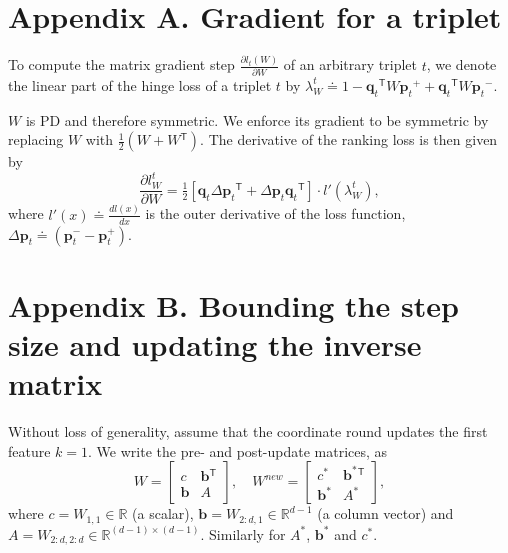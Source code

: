 \documentclass[twoside,11pt]{article}
\newcommand\mat[1]{{#1}}
\renewcommand\vec[1]{\mathbf{#1}}
\newcommand{\T}{{}^\mathsf{T}}
\newcommand{\W}{\mat{W}}
\newcommand{\newW}{{\mat{W^{new}}}}
\newcommand{\eqdef}{\doteq}
\newcommand{\R}{\mathbb{R}}
\newcommand{\q}{{\vec{q}}}
\newcommand{\p}{{\vec{p}}}
\newcommand{\trip}{{t}}
\newcommand{\qt}{{\q_{\trip}}}
\newcommand{\pt}{{\p_{\trip}}}
\newcommand{\B}{\vec{b}}
\newcommand{\C}{c}
\newcommand{\Wvec}{\W_{2:d,1}}
\newcommand{\Wscalar}{\W_{1,1}}
\begin{document}
\newpage

\appendix
\section*{Appendix A. Gradient for a triplet}
\label{appendix-grad}
To compute the matrix gradient step $\frac{\partial {l_t (\W)}}{\partial \W}$ of an arbitrary triplet $t$, we denote the linear part of the hinge loss of a triplet $t$ by $\lambda_{W}^t \eqdef 
1-\qt\T \W \pt^{+} + \qt\T\W\pt^{-}.$

$\W$ is PD and therefore symmetric. We enforce its gradient to be symmetric by replacing $\W$ with $\tfrac{1}{2}(\W + \W\T)$. The derivative of the ranking loss is then given by
\begin{equation}
  \frac{\partial {l_{\W}^{t}}}{\partial \W} = \tfrac{1}{2}[\vec{q}_{t}\Delta\vec{p}_{t}\T  + \Delta\vec{p}_{t}\vec{q}_{t}\T]\cdot {l'}(\lambda_{W}^t),
  \label{dlossranking} \nonumber 
\end{equation}
where $l'(x) \eqdef \frac{d{l(x)}}{dx}$ is the outer derivative of the loss function, $\Delta\vec{p}_{t} \eqdef (\vec{p}_{t}^{-} - \vec{p}_{t}^{+})$.

\section*{Appendix B. Bounding the step size and updating the inverse matrix}
\label{appendix-inverse}
Without loss of generality, assume that the coordinate round updates the first feature $k = 1$. We write the pre- and post-update matrices, as
\begin{equation}
  \W = \left[ \begin{matrix} \C & \B\T \\ \B & A \end{matrix} \right],
  \quad
  \newW = \left[ \begin{matrix} \C^* & \B^*\T \\ \B^* & A^* \end{matrix} \right],
  \label{schurNotationPreUpdate}
\end{equation}
 where $\C = \Wscalar \in \R$ (a scalar), $\B = \Wvec \in \R^{d-1}$ (a column vector) and $A = \W_{2:d,2:d} \in \R^{(d-1) \times (d-1)}$. Similarly for $A^*$, $\B^*$ and $\C^*$.
\end{document}
